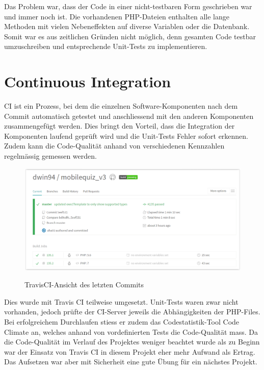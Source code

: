 Das Problem war, dass der Code in einer nicht-testbaren Form geschrieben war und immer noch ist. Die vorhandenen PHP-Dateien enthalten alle lange Methoden mit vielen Nebeneffekten auf diverse Variablen oder die Datenbank. Somit war es aus zeitlichen Gründen nicht möglich, denn gesamten Code testbar umzuschreiben und entsprechende Unit-Tests zu implementieren.



\section{Continuous Integration}
\acrfull{CI} ist ein Prozess, bei dem die einzelnen Software-Komponenten nach dem \gls{Commit} automatisch getestet und anschliessend mit den anderen Komponenten zusammengefügt werden. Dies bringt den Vorteil, dass die Integration der Komponenten laufend geprüft wird und die Unit-Tests Fehler sofort erkennen. Zudem kann die Code-Qualität anhand von verschiedenen Kennzahlen regelmässig gemessen werden.


\begin{figure}[H]
	\centering
	\includegraphics[width=1\textwidth]{Images/travisCI.PNG}
	\caption{TravisCI-Ansicht des letzten Commits}
	\cite{travisCI}
\end{figure}


Dies wurde mit Travis CI \cite{travisCI} teilweise umgesetzt. Unit-Tests waren zwar nicht vorhanden, jedoch prüfte der \acrshort{CI}-Server jeweils die Abhängigkeiten der PHP-Files. Bei erfolgreichem Durchlaufen stiess er zudem das Codestatistik-Tool Code Climate \cite{codeclimate} an, welches anhand von vordefinierten Tests die Code-Qualität mass.
Da die Code-Qualität im Verlauf des Projektes weniger beachtet wurde als zu Beginn war der Einsatz von Travis CI \cite{travisCI} in diesem Projekt eher mehr Aufwand als Ertrag. Das Aufsetzen war aber mit Sicherheit eine gute Übung für ein nächstes Projekt.